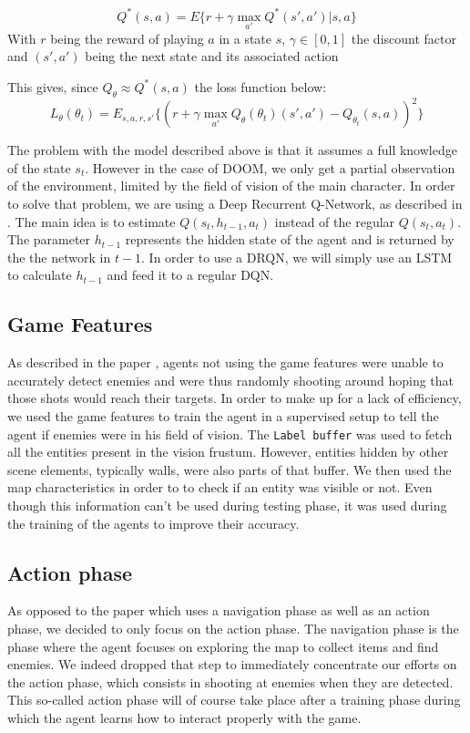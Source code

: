 \documentclass[letterpaper]{article}
\begin{document}
$$ Q^*(s,a) = E\{r + \gamma \max_{a'}Q^*(s',a')|s,a\} $$
With $r$ being the reward of playing $a$ in a state $s$, $\gamma\in [0,1]$ the discount factor and $(s',a')$ being the next state and its associated action

This gives, since $Q_{\theta} \approx Q^*(s,a)$ the loss function below:
$$ L_\theta(\theta_t) = E_{s,a,r,s'}\{(r +\gamma \max_{a'}Q_\theta(\theta_t)(s' , a' )-Q_{\theta_t}(s,a))^2\}$$


The problem with the model described above is that it assumes a full knowledge of the state $s_t$. However in the case of DOOM, we only get a partial observation of the environment, limited by the field of vision of the main character. In order to solve that problem, we are using a Deep Recurrent Q-Network, as described in \citep{Hausknecht2015}. The main idea is to estimate $Q(s_t,h_{t-1},a_t)$ instead of the regular $Q(s_t,a_t)$. The parameter $h_{t-1}$ represents the hidden state of the agent and is returned by the the network in $t-1$. In order to use a DRQN, we will simply use an LSTM to calculate $h_{t-1}$ and feed it to a regular DQN.

\subsection{Game Features}
As described in the paper \citep{Lample2016}, agents not using the game features were unable to accurately detect enemies and were thus randomly shooting around hoping that those shots would reach their targets. In order to make up for a lack of efficiency, we used the game features to train the agent in a supervised setup to tell the agent if enemies were in his field of vision. The \texttt{Label buffer} was used to fetch all the entities present in the vision frustum. However, entities hidden by other scene elements, typically walls, were also parts of that buffer. We then used the map characteristics in order to to check if an entity was visible or not. Even though this information can't be used during testing phase, it was used during the training of the agents to improve their accuracy.

\subsection{Action phase}
As opposed to the paper \citep{Lample2016} which uses a navigation phase as well as an action phase, we decided to only focus on the action phase. The navigation phase is the phase where the agent focuses on exploring the map to collect items and find enemies. We indeed dropped that step to immediately concentrate our efforts on the action phase, which consists in shooting at enemies when they are detected. This so-called action phase will of course take place after a training phase during which the agent learns how to interact properly with the game.
\end{document}
